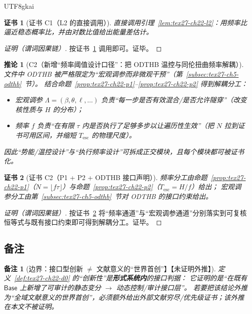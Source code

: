 \documentclass[12pt]{article}
\newtheorem{corollary}{推论}[section]
\newtheorem{remark}{备注}[section]
\newtheorem{Certificate}{证书}[section]
\begin{document}
\begin{CJK*}{UTF8}{gkai}
\begin{Certificate}[证书 C1（L2 的直接调用）]
\label{cert:tex27-ch22-c1}
直接调用引理~\ref{lem:tex27-ch22-l2}：用频率比逼近稳态概率比，并由对数比值给出能量差估计。
\end{Certificate}

\begin{proof}[证明（谓词因果链）]
按证书~\ref{cert:tex27-ch22-c1} 调用即可。证毕。
\end{proof}

\begin{corollary}[C2（新增“频率阈值设计口径”：把 ODTHB 温控与同伦扭曲频率解耦）]
\label{cor:tex27-ch22-c2}
文件中 ODTHB 被严格限定为“宏观调参而非微观干预”（第~\ref{subsec:tex27-ch5-odthb}~节）。
结合命题~\ref{prop:tex27-ch22-p1}--\ref{prop:tex27-ch22-p2} 得到解耦分工：
\begin{itemize}
  \item 宏观调参 $\Lambda=(\beta,\theta,\ell,\dots)$ 负责“每一步是否有效混合/是否允许隧穿”（改变核性质与 $H$ 的分布）；
  \item 频率 $f$ 负责“在有限 $\tau$ 内是否执行了足够多步以让遍历性生效”（把 $N$ 拉到证书可用区间，并缩短 $T_{\mathrm{esc}}$ 的物理尺度）。
\end{itemize}
因此“势能/温控设计”与“执行频率设计”可拆成正交模块，且每个模块都可被证书化。
\end{corollary}

\begin{Certificate}[证书 C2（P1 + P2 + ODTHB 接口声明）]
\label{cert:tex27-ch22-c2}
频率分工由命题~\ref{prop:tex27-ch22-p1}（$N=\lfloor f\tau\rfloor$）与命题~\ref{prop:tex27-ch22-p2}（$T_{\mathrm{esc}}=H/f$）给出；
宏观调参分工由第~\ref{subsec:tex27-ch5-odthb}~节对 ODTHB 的接口约束给出。
\end{Certificate}

\begin{proof}[证明（谓词因果链）]
按证书~\ref{cert:tex27-ch22-c2} 将“频率通道”与“宏观调参通道”分别落实到可复核恒等式与既有接口约束即可得到解耦分工。证毕。
\end{proof}

\subsection{备注}
\label{subsec:tex27-ch22-remarks}

\begin{remark}[边界：接口型创新 $\neq$ 文献意义的“世界首创”】【未证明外推】]
\label{rem:tex27-ch22-r1}
定义~\ref{def:tex27-ch22-d0} 的“创新性”是\textbf{形式系统内}的接口判据：
它证明的是“在既有 $\mathsf{Base}$ 上新增了可审计的静态变分 $\to$ 动态控制/审计接口层”。
若要把该结论外推为“全域文献意义的世界首创”，必须额外给出外部文献穷尽/优先级证书；该外推在本文不被证明。
\end{remark}


\end{CJK*}
\end{document}
